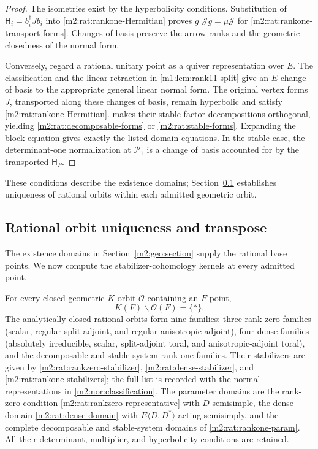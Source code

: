 \begin{proof}
The isometries exist by the hyperbolicity conditions.
Substitution of $\mathsf H_i=b_i^\dagger Jb_i$ into
\eqref{m2:rat:rankone-Hermitian} proves
$g^\dagger\mathcal Jg=\mu\mathcal J$ for
\eqref{m2:rat:rankone-transport-forms}.  Changes of basis
preserve the arrow ranks and the geometric closedness
of the normal form.

Conversely, regard a rational unitary point as a quiver
representation over $E$.  The classification and the
linear retraction in \cref{m1:lem:rank11-split} give
an $E$-change of basis to the appropriate general linear
normal form. The original vertex forms $J$, transported along
these changes of basis, remain hyperbolic and satisfy
\eqref{m2:rat:rankone-Hermitian}.
 makes their stable-factor
decompositions orthogonal, yielding
\eqref{m2:rat:decomposable-forms} or \eqref{m2:rat:stable-forms}.
Expanding the block equation gives exactly the listed
domain equations.  In the stable case, the determinant-one normalization at
$\mathcal P_1$ is a change of basis accounted for by the transported
$\mathsf H_P$.
\end{proof}

These conditions describe the existence domains;
Section~\ref{m2:rat:section} establishes uniqueness of rational orbits
within each admitted geometric orbit.

\subsection{Rational orbit uniqueness and transpose}\label{m2:rat:section}

The existence domains in Section~\ref{m2:geo:section} supply the rational base points. We now compute the stabilizer-cohomology kernels at every admitted point.

\begin{theorem}\label{m2:rat:classification}
For every closed geometric $K$-orbit $\mathscr O$ containing an
$F$-point,
\begin{equation}\label{m2:rat:unique-orbit}
 K(F)\backslash\mathscr O(F)=\{*\}.
\end{equation}
The analytically closed rational orbits form nine families:
three rank-zero families (scalar, regular split-adjoint, and regular
anisotropic-adjoint), four dense families (absolutely irreducible,
scalar, split-adjoint toral, and anisotropic-adjoint toral), and the
decomposable and stable-system rank-one families. Their stabilizers
are given by \eqref{m2:rat:rankzero-stabilizer},
\eqref{m2:rat:dense-stabilizer}, and
\cref{m2:rat:rankone-stabilizers}; the full list is recorded with the
normal representations in \cref{m2:nor:classification}.
The parameter domains are
the rank-zero condition \eqref{m2:rat:rankzero-representative} with
$D$ semisimple, the dense domain \eqref{m2:rat:dense-domain} with
$E\langle D,D^*\rangle$ acting semisimply, and the complete
decomposable and stable-system domains of
\cref{m2:rat:rankone-param}. All their determinant, multiplier, and
hyperbolicity conditions are retained.
\end{theorem}


